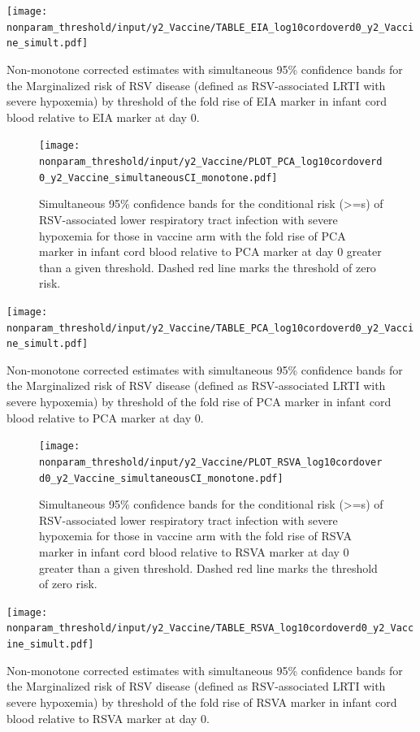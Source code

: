 \documentclass[11pt]{article}
\begin{document}
\begin{table}[H]
    \centering
    \texttt{[image: nonparam\_threshold/input/y2\_Vaccine/TABLE\_EIA\_log10cordoverd0\_y2\_Vaccine\_simult.pdf]}
  \caption{Non-monotone corrected estimates with simultaneous 95\% confidence bands for the Marginalized risk of RSV disease (defined as RSV-associated LRTI with severe hypoxemia) by threshold of the fold rise of EIA marker in infant cord blood relative to EIA marker at day 0. }
\end{table}

\begin{figure}[H]
    \centering
    \texttt{[image: nonparam\_threshold/input/y2\_Vaccine/PLOT\_PCA\_log10cordoverd0\_y2\_Vaccine\_simultaneousCI\_monotone.pdf]}
   \caption{Simultaneous 95\% confidence bands for the conditional risk (>=s) of RSV-associated lower respiratory tract infection with severe hypoxemia for those in vaccine arm with the fold rise of PCA marker in infant cord blood relative to PCA marker at day 0 greater than a given threshold. Dashed red line marks the threshold of zero risk.}
      \label{tab:PLOT_PCA_log10cordoverd0_y2_Vaccine_monotone}
\end{figure}

\begin{table}[H]
    \centering
    \texttt{[image: nonparam\_threshold/input/y2\_Vaccine/TABLE\_PCA\_log10cordoverd0\_y2\_Vaccine\_simult.pdf]}
  \caption{Non-monotone corrected estimates with simultaneous 95\% confidence bands for the Marginalized risk of RSV disease (defined as RSV-associated LRTI with severe hypoxemia) by threshold of the fold rise of PCA marker in infant cord blood relative to PCA marker at day 0. }
\end{table}

\begin{figure}[H]
    \centering
    \texttt{[image: nonparam\_threshold/input/y2\_Vaccine/PLOT\_RSVA\_log10cordoverd0\_y2\_Vaccine\_simultaneousCI\_monotone.pdf]}
   \caption{Simultaneous 95\% confidence bands for the conditional risk (>=s) of RSV-associated lower respiratory tract infection with severe hypoxemia for those in vaccine arm with the fold rise of RSVA marker in infant cord blood relative to RSVA marker at day 0 greater than a given threshold. Dashed red line marks the threshold of zero risk.}
      \label{tab:PLOT_RSVA_log10cordoverd0_y2_Vaccine_monotone}
\end{figure}

\begin{table}[H]
    \centering
    \texttt{[image: nonparam\_threshold/input/y2\_Vaccine/TABLE\_RSVA\_log10cordoverd0\_y2\_Vaccine\_simult.pdf]}
  \caption{Non-monotone corrected estimates with simultaneous 95\% confidence bands for the Marginalized risk of RSV disease (defined as RSV-associated LRTI with severe hypoxemia) by threshold of the fold rise of RSVA marker in infant cord blood relative to RSVA marker at day 0. }
\end{table}
\end{document}
